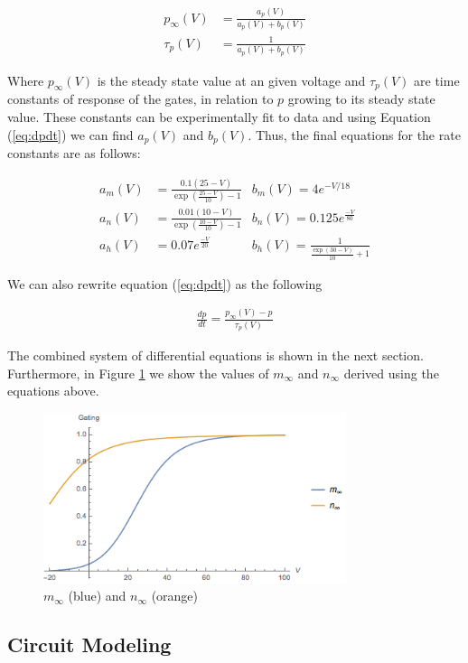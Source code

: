 \documentclass[12]{book}
\newcommand\0{\mathbf{0}}
\newcommand\<{\langle}
\renewcommand\>{\rangle}
\begin{document}
\begin{align}
\label{eq:time}
    p_{\infty}(V) &= \frac{a_p(V)}{a_p(V) + b_p(V)} \\
    \tau_p(V) &= \frac{1}{a_p(V) + b_p(V)} 
\end{align}

Where $p_{\infty}(V)$ is the steady state value at an given voltage and ${\tau_p}(V)$ are time constants of response of the gates, in relation to $p$ growing to its steady state value. These constants can be experimentally fit to data and using Equation (\ref{eq:dpdt}) we can find $a_p(V)$ and $b_p(V)$. Thus, the final equations for the rate constants are as follows:

\begin{align*}
    a_m(V) &= \frac{0.1(25-V)}{\exp(\frac{25-V}{10})-1}
    &b_m(V) = 4e^{-V/18} \\
    a_n(V) &= \frac{0.01(10-V)}{\exp(\frac{10-V}{10})-1} 
    &b_n(V) = 0.125e^{\frac{-V}{80}}\\
    a_h(V) &= 0.07e^{\frac{-V}{20}} 
    &b_h(V) = \frac{1}{\frac{\exp(30-V)}{10}+1}
\end{align*}

We can also rewrite equation (\ref{eq:dpdt}) as the following

\begin{align*}
    \frac{dp}{dt} = \frac{p_{\infty}(V)-p}{\tau_p(V)}
\end{align*}

The combined system of differential equations is shown in the next section. Furthermore, in Figure \ref{fig:inf} we show the values of $m_\infty$ and $n_\infty$ derived using the equations above. 

\begin{figure}[h]
\centering
	\includegraphics[height=5cm]{gating.png}
	\caption{$m_{\infty}$ (blue) and $n_{\infty}$ (orange)}
		\label{fig:inf}
\end{figure}

\subsection{Circuit Modeling} 
\end{document}
